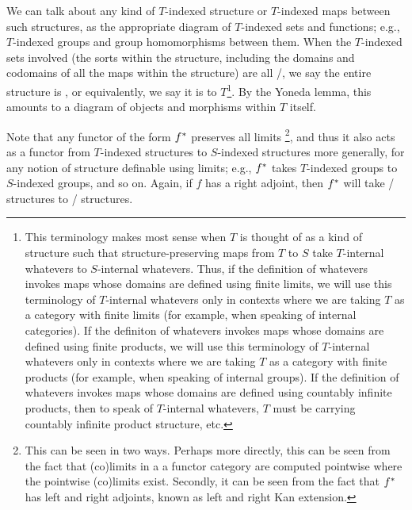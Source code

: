 We can talk about any kind of $T$-indexed structure or $T$-indexed maps between such structures, as the appropriate diagram of $T$-indexed sets and functions; e.g., $T$-indexed groups and group homomorphisms between them. When the $T$-indexed sets involved (the sorts within the structure, including the domains and codomains of all the maps within the structure) are all \repsmall/, we say the entire structure is , or equivalently, we say it is  to $T$\footnote{This  terminology makes most sense when $T$ is thought of as a kind of structure such that structure-preserving maps from $T$ to $S$ take $T$-internal whatevers to $S$-internal whatevers. Thus, if the definition of whatevers invokes maps whose domains are defined using finite limits, we will use this terminology of $T$-internal whatevers only in contexts where we are taking $T$ as a category with finite limits (for example, when speaking of internal categories). If the definiton of whatevers invokes maps whose domains are defined using finite products, we will use this terminology of $T$-internal whatevers only in contexts where we are taking $T$ as a category with finite products (for example, when speaking of internal groups). If the definition of whatevers invokes maps whose domains are defined using countably infinite products, then to speak of $T$-internal whatevers, $T$ must be carrying countably infinite product structure, etc.}. By the Yoneda lemma, this amounts to a diagram of objects and morphisms within $T$ itself.

Note that any functor of the form $f^*$ preserves all limits \footnote{This can be seen in two ways. Perhaps more directly, this can be seen from the fact that (co)limits in a a functor category are computed pointwise where the pointwise (co)limits exist. Secondly, it can be seen from the fact that $f^*$ has left and right adjoints, known as left and right Kan extension. }, and thus it also acts as a functor from $T$-indexed structures to $S$-indexed structures more generally, for any notion of structure definable using limits; e.g., $f^*$ takes $T$-indexed groups to $S$-indexed groups, and so on. Again, if $f$ has a right adjoint, then $f^*$ will take \repsmall/ structures to \repsmall/ structures.

